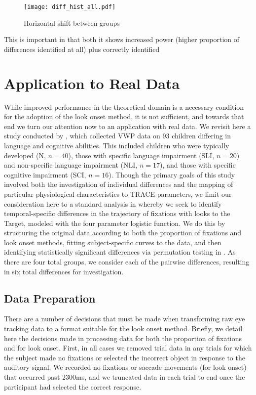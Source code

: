 \begin{figure}[H]
\centering
\texttt{[image: diff\_hist\_all.pdf]}
\caption{Horizontal shift between groups}
\label{fig:diff_hist_all}
\end{figure}

This is important in that both it shows increased power (higher proportion of differences identified at all) plus correctly identified

\section{Application to Real Data}

While improved performance in the theoretical domain is a necessary condition for the adoption of the look onset method, it is not sufficient, and towards that end we turn our attention now to an application with real data. We revisit here a study conducted by \cite{mcmurray2010individual}, which collected VWP data on 93 children differing in language and cognitive abilities. This included children who were typically developed (N, $n = 40$), those with specific language impairment (SLI, $n = 20$) and non-specific language impairment (NLI, $n = 17$), and those with specific cognitive impairment (SCI, $n = 16$). Though the primary goals of this study involved both the investigation of individual differences and the mapping of particular physiological characteristics to TRACE parameters, we limit our consideration here to a standard analysis in  whereby we seek to identify temporal-specific differences in the trajectory of fixations with looks to the Target, modeled with the four parameter logistic function. We do this by structuring the original data according to both the proportion of fixations and look onset methods, fitting subject-specific curves to the data, and then identifying statistically significant differences via permutation testing in . As there are four total groups, we consider each of the pairwise differences, resulting in six total differences for investigation.

\subsection{Data Preparation}

There are a number of decisions that must be made when transforming raw eye tracking data to a format suitable for the look onset method. Briefly, we detail here the decisions made in processing data for both the proportion of fixations and for look onset. First, in all cases we removed trial data in any trials for which the subject made no fixations or selected the incorrect object in response to the auditory signal. We recorded no fixations or saccade movements (for look onset) that occurred past 2300ms, and we truncated data in each trial to end once the participant had selected the correct response.

